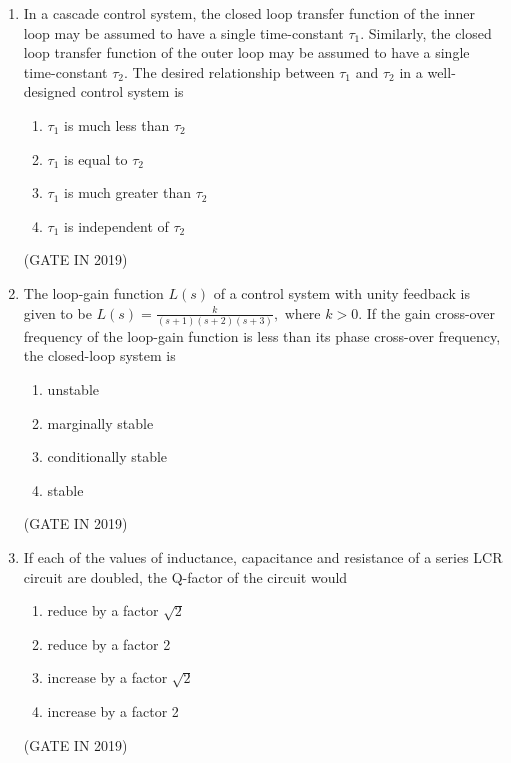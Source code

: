\documentclass[journal]{IEEEtran}
\begin{document}
\begin{enumerate}
\item In a cascade control system, the closed loop transfer function of the inner loop may be assumed to have a single time-constant $\tau_1$. Similarly, the closed loop transfer function of the outer loop may be assumed to have a single time-constant $\tau_2$. The desired relationship between $\tau_1$ and $\tau_2$ in a well-designed control system is
\begin{enumerate}
\item $\tau_1$ is much less than $\tau_2$
\item $\tau_1$ is equal to $\tau_2$
\item $\tau_1$ is much greater than $\tau_2$
\item $\tau_1$ is independent of $\tau_2$
\end{enumerate}
 \hfill(GATE IN 2019)

\item The loop-gain function $L(s)$ of a control system with unity feedback is given to be
$L(s) = \frac{k}{(s+1)(s+2)(s+3)}, \text{ where } k > 0.$
If the gain cross-over frequency of the loop-gain function is less than its phase cross-over frequency, the closed-loop system is
\begin{enumerate}
\item unstable
\item marginally stable
\item conditionally stable
\item stable
\end{enumerate}
 \hfill(GATE IN 2019)

\item If each of the values of inductance, capacitance and resistance of a series LCR circuit are doubled, the Q-factor of the circuit would

\begin{enumerate}
\item reduce by a factor $\sqrt{2}$
\item reduce by a factor 2
\item increase by a factor $\sqrt{2}$
\item increase by a factor 2
\end{enumerate}
\hfill(GATE IN 2019)


\end{enumerate}
\end{document}
